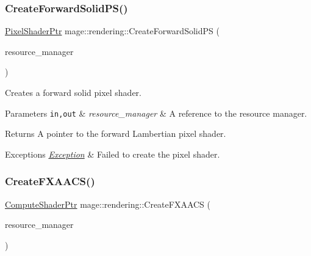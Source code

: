\subsubsection{\texorpdfstring{Create\+Forward\+Solid\+P\+S()}{CreateForwardSolidPS()}}
{\footnotesize\ttfamily \mbox{\hyperlink{namespacemage_1_1rendering_af03d922b228ee9c8542baaa2ecc9f259}{Pixel\+Shader\+Ptr}} mage\+::rendering\+::\+Create\+Forward\+Solid\+PS (\begin{DoxyParamCaption}\item[{\mbox{\hyperlink{classmage_1_1rendering_1_1_resource_manager}{Resource\+Manager}} \&}]{resource\+\_\+manager }\end{DoxyParamCaption})}

Creates a forward solid pixel shader.


\begin{DoxyParams}[1]{Parameters}
\mbox{\tt in,out}  & {\em resource\+\_\+manager} & A reference to the resource manager. \\
\hline
\end{DoxyParams}
\begin{DoxyReturn}{Returns}
A pointer to the forward Lambertian pixel shader. 
\end{DoxyReturn}

\begin{DoxyExceptions}{Exceptions}
{\em \mbox{\hyperlink{classmage_1_1_exception}{Exception}}} & Failed to create the pixel shader. \\
\hline
\end{DoxyExceptions}
\mbox{\label{namespacemage_1_1rendering_a3913975f7b65d4e304a173edaab57732}} 
\subsubsection{\texorpdfstring{Create\+F\+X\+A\+A\+C\+S()}{CreateFXAACS()}}
{\footnotesize\ttfamily \mbox{\hyperlink{namespacemage_1_1rendering_ab3dc9f2114f2e9255b91d9c051da52ea}{Compute\+Shader\+Ptr}} mage\+::rendering\+::\+Create\+F\+X\+A\+A\+CS (\begin{DoxyParamCaption}\item[{\mbox{\hyperlink{classmage_1_1rendering_1_1_resource_manager}{Resource\+Manager}} \&}]{resource\+\_\+manager }\end{DoxyParamCaption})}

